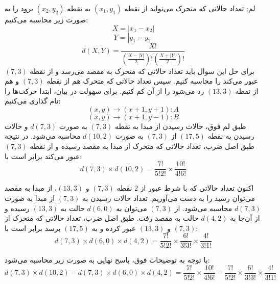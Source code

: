 \p
لم: تعداد حالاتی که متحرک می‌تواند از نقطه
$(x_1 , y_1)$
به نقطه
$(x_2 , y_2)$
‌برود را به صورت زیر محاسبه می‌کنیم:
$$X = |x_1 - x_2|$$
$$Y = |y_1 - y_2|$$
$$d(X , Y) = \frac{X!}{(\frac{X - |Y|}{2})!(\frac{X + |Y|}{2})!} $$
\p
برای حل این سوال باید تعداد حالاتی که متحرک به مقصد می‌رسد و از نقطه 
$(7, 3)$ 
عبور می‌کند را محاسبه کنیم. سپس تعداد حالاتی که متحرک هم از نقطه
$(7, 3)$ 
و هم از نقطه 
$(13, 3)$ 
رد می‌شود را از آن کم ‌کنیم. برای سهولت در بیان، ابتدا حرکت‌ها را نام گذاری می‌کنیم:
$$(x ,y) \to (x + 1, y + 1) : A $$
$$ (x, y) \to (x + 1, y - 1) : B$$
طبق لم فوق، حالات رسیدن از مبدا به نقطه
$(7, 3)$
 به صورت
$d(7, 3)$
و حالات رسیدن به نقطه
$(17, 5)$
از 
$(7, 3)$
به صورت 
$d(10, 2)$
محاسبه می‌شود. در نتیجه طبق اصل ضرب، تعداد حالاتی که متحرک از مبدا به مقصد رسیده و از نقطه 
$(7, 3)$
عبور می‌کند برابر است با:
$$d(7, 3) \times d(10, 2) = \frac{7!}{5!2!}\times\frac{10!}{4!6!}$$

اکنون تعداد حالاتی که با شرط عبور از
2 
نقطه
$(7, 3)$ 
و
$(13, 3)$،
از مبدا به مقصد می‌توان رسید  
را به دست می‌آوریم.
تعداد حالات رسیدن به 
$(7, 3)$
از مبدا 
به صورت
$d(7, 3)$
محاسبه می‌شود.
از
$(7, 3)$ 
می‌توان به 
$d(6, 0)$
حالت به
$(13, 3)$
رسیده و از آن‌جا به 
$d(4, 2)$
حالت به مقصد رفت.
 طبق اصل ضرب، تعداد حالاتی که متحرک از
  $(7, 3)$ 
 و
 $(13, 3)$
 عبور کرده و به
 $(17, 5)$
 برسد برابر است با:
 $$d(7, 3) \times d(6, 0) \times d(4, 2) = \frac{7!}{5!2!}\times\frac{6!}{3!3!}\times\frac{4!}{3!1!}$$

با توجه به توضیحات فوق، پاسح نهایی به صورت زیر محاسبه می‌شود:
$$d(7, 3) \times d(10, 2) - d(7, 3) \times d(6, 0) \times d(4, 2) = \frac{7!}{5!2!}\times\frac{10!}{4!6!} - \frac{7!}{5!2!}\times\frac{6!}{3!3!}\times\frac{4!}{3!1!}$$